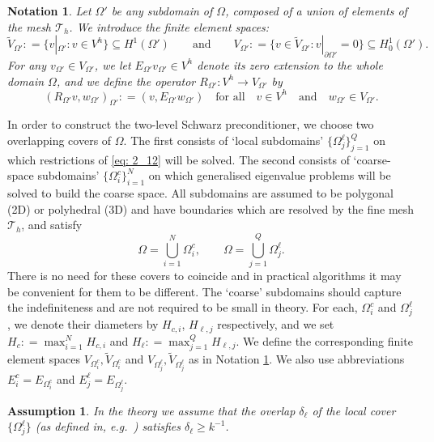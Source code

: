 \documentclass[numbers,webpdf,imaiai]{ima-authoring-template}%
\theoremstyle{thmstyletwo}%
\newtheorem{assumption}[theorem]{Assumption}%
\newtheorem{notation}[theorem]{Notation}
\numberwithin{equation}{section}
\newcommand{\assign}{\mathrel{\mathop:}=}
\numberwithin{equation}{section}
\begin{document}
{\begin{notation} \label{not:generalD}
Let $\Omega'$ be any subdomain of  $\Omega$, composed of a union of elements of the mesh $\mathcal{T}_h$.
We introduce the finite element spaces:
\begin{equation*}
	\widetilde{V}_{\Omega'} \assign \bigl\{v|_{\Omega'} : v \in V^h\bigr\} \subseteq H^1(\Omega') 
	\qquad \text{and} \qquad 
	V_{\Omega'} \assign \bigl\{v \in \widetilde{V}_{\Omega'} : v|_{\partial \Omega'} = 0\bigr\} \subseteq H^1_0(\Omega'). 
\end{equation*}
For any $v_{\Omega'} \in V_{\Omega'}$, we let $E_{\Omega'} v_{\Omega'} \in V^h$ denote its zero extension to the whole domain $\Omega$, 
and we  define the operator $R_{\Omega'}:  V^h \rightarrow V_{\Omega'}$  by
\[
  (R_{\Omega'} v , w_{\Omega'})_{\Omega'} \assign (v,E_{\Omega'}w_{\Omega'}) \quad \text{for all} \quad  v \in V^h \quad \text{and} \quad  w_{\Omega'} \in V_{\Omega'}.
\]
\end{notation}

In order to construct the two-level Schwarz preconditioner, we  choose two overlapping covers of $\Omega$.
The first  consists of `local subdomains' $\{\Omega_j^\ell\}_{j=1}^Q$ 
on which  restrictions of \eqref{eq:  2_12} 
will be solved.  
The second consists of `coarse-space subdomains' $\{\Omega_i^c\}_{i=1}^N$ on which generalised eigenvalue problems will be solved
to build  the  coarse space.  All subdomains are assumed to be polygonal (2D) or polyhedral (3D) and have boundaries which are  
resolved by the fine mesh $\mathcal{T}_h$,
and satisfy  
\begin{equation} 
	\Omega = \bigcup_{i=1}^{N} \Omega_i^c, \qquad \Omega = \bigcup_{j=1}^{Q} \Omega_j^\ell.
	\label{covers}
\end{equation}
There is no need for these covers to coincide and in practical algorithms
it may be convenient for them to be different. The `coarse' subdomains should capture the indefiniteness and are not required to be small in theory. 
For each, ${\Omega_i^c}$ and ${\Omega_j^\ell}$, we denote their  diameters by $H_{c,i}$, $H_{\ell,j}$ respectively, 
and we set $H_c \assign \max_{i=1}^N H_{c,i}$ and $H_\ell \assign \max_{j=1}^Q H_{\ell,j}$.
We  define the corresponding finite element spaces 
$V_{\Omega^c_i}, \widetilde{V}_{\Omega^c_i}$ and $V_{\Omega^\ell_j}, \widetilde{V}_{\Omega^\ell_j}$ 
as in Notation \ref{not:generalD}.  We also use abbreviations $E_i^c = E_{\Omega_i^c}$ and $E_j^\ell = E_{\Omega_j^\ell}$.

\begin{assumption}\label{ass:overlap}
  In the theory we assume that the overlap $\delta_\ell$  of the local cover  $\{\Omega_j^\ell\}$ (as defined in,
  e.g.\ \cite[p.~56]{Toselli:2005:DDM}) satisfies $\delta_\ell \geq k^{-1}$.
\end{assumption} 

}
\end{document}
